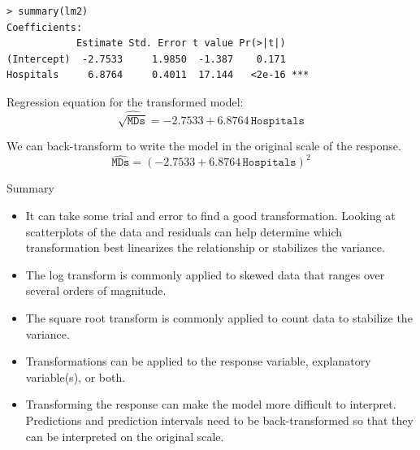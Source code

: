 \documentclass[10pt]{beamer}
\begin{document}
\begin{frame}[fragile]
\begin{verbatim}
> summary(lm2)
Coefficients:
            Estimate Std. Error t value Pr(>|t|)    
(Intercept)  -2.7533     1.9850  -1.387    0.171    
Hospitals     6.8764     0.4011  17.144   <2e-16 ***
\end{verbatim}
\vspace{10pt}

Regression equation for the transformed model:
$$\widehat{\sqrt{\texttt{MDs}}} = -2.7533 + 6.8764 \, \texttt{Hospitals}$$

We can back-transform to write the model in the original scale of the response. 
$$\widehat{\texttt{MDs}} = (-2.7533 + 6.8764 \, \texttt{Hospitals})^2$$
\end{frame}


\begin{frame}{Summary}
\begin{itemize}
\item It can take some trial and error to find a good transformation.  Looking at scatterplots of the data and residuals can help determine which transformation best linearizes the relationship or stabilizes the variance.
\item The log transform is commonly applied to skewed data that ranges over several orders of magnitude.
\item The square root transform is commonly applied to count data to stabilize the variance.
\item Transformations can be applied to the response variable, explanatory variable(s), or both. 
\item Transforming the response can make the model more difficult to interpret.  Predictions and prediction intervals need to be back-transformed so that they can be interpreted on the original scale.
\end{itemize}
\end{frame}
\end{document}
